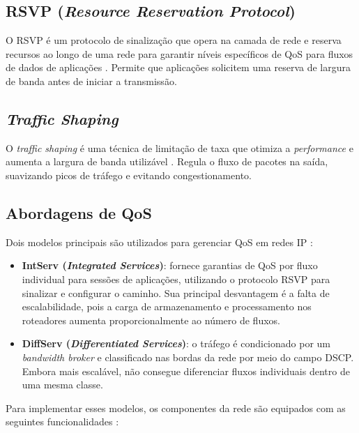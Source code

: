 \subsection{RSVP (\textit{Resource Reservation Protocol})}

O RSVP é um protocolo de sinalização que opera na camada de rede e reserva recursos ao longo de
uma rede para garantir níveis específicos de QoS para fluxos de dados de
aplicações \cite{fortinet2024}. Permite que aplicações solicitem uma reserva de
largura de banda antes de iniciar a transmissão.

\subsection{\textit{Traffic Shaping}}

O \textit{traffic shaping} é uma técnica de limitação de taxa que otimiza a
\textit{performance} e aumenta a largura de banda utilizável \cite{fortinet2024}.
Regula o fluxo de pacotes na saída, suavizando picos de tráfego e evitando
congestionamento.

\subsection{Abordagens de QoS}

Dois modelos principais são utilizados para gerenciar QoS em redes IP
\cite{ieee_ipv6qos}:

\begin{itemize}
  \item \textbf{IntServ (\textit{Integrated Services})}: fornece garantias de QoS
  por fluxo individual para sessões de aplicações, utilizando o protocolo RSVP
  para sinalizar e configurar o caminho. Sua principal desvantagem é a falta de
  escalabilidade, pois a carga de armazenamento e processamento nos roteadores
  aumenta proporcionalmente ao número de fluxos.
  \item \textbf{DiffServ (\textit{Differentiated Services})}: o tráfego é
  condicionado por um \textit{bandwidth broker} e classificado nas bordas da rede
  por meio do campo DSCP. Embora mais escalável, não consegue diferenciar fluxos
  individuais dentro de uma mesma classe.
\end{itemize}

Para implementar esses modelos, os componentes da rede são equipados com as
seguintes funcionalidades \cite{ieee_ipv6qos}:


